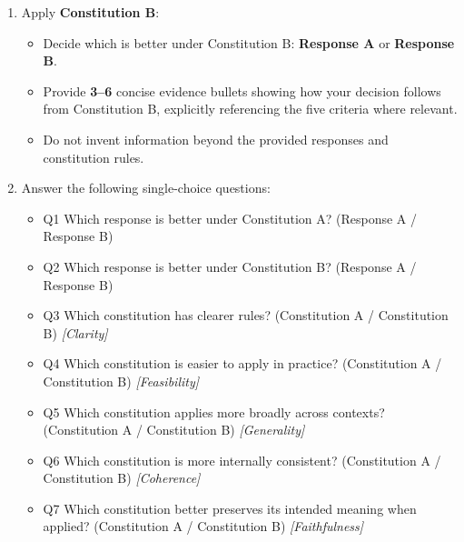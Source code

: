 \begin{tcolorbox}
\begin{enumerate}
  \item Apply \textbf{Constitution B}:
  \begin{itemize}
    \item Decide which is better under Constitution B: \textbf{Response A} or \textbf{Response B}.
    \item Provide \textbf{3--6} concise evidence bullets showing how your decision follows from Constitution B, explicitly referencing the five criteria where relevant.
    \item Do not invent information beyond the provided responses and constitution rules.
  \end{itemize}

  \item Answer the following single-choice questions:

  \begin{itemize}
    \item Q1 Which response is better under Constitution A? (Response A / Response B)
    \item Q2 Which response is better under Constitution B? (Response A / Response B)
    \item Q3 Which constitution has clearer rules? (Constitution A / Constitution B) \textit{[Clarity]}
    \item Q4 Which constitution is easier to apply in practice? (Constitution A / Constitution B) \textit{[Feasibility]}
    \item Q5 Which constitution applies more broadly across contexts? (Constitution A / Constitution B) \textit{[Generality]}
    \item Q6 Which constitution is more internally consistent? (Constitution A / Constitution B) \textit{[Coherence]}
    \item Q7 Which constitution better preserves its intended meaning when applied? (Constitution A / Constitution B) \textit{[Faithfulness]}
  \end{itemize}
\end{enumerate}
\end{tcolorbox}
\begin{center}
\label{consitution_analysis}
\end{center}

% 
% 

